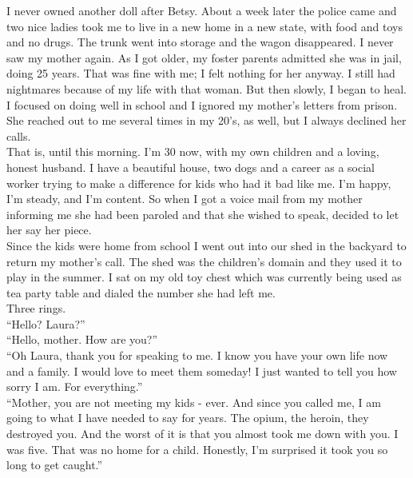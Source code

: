 \documentclass[a5paper]{scrartcl}
\begin{document}
I never owned another doll after Betsy. About a week later the police came and two nice ladies took me to live in a new home in a new state, with food and toys and no drugs. The trunk went into storage and the wagon disappeared. I never saw my mother again. As I got older, my foster parents admitted she was in jail, doing 25 years. That was fine with me; I felt nothing for her anyway. I still had nightmares because of my life with that woman. But then slowly, I began to heal. I focused on doing well in school and I ignored my mother's letters from prison. She reached out to me several times in my 20's, as well, but I always declined her calls.\\

That is, until this morning. I'm 30 now, with my own children and a loving, honest husband. I have a beautiful house, two dogs and a career as a social worker trying to make a difference for kids who had it bad like me. I'm happy, I'm steady, and I'm content. So when I got a voice mail from my mother informing me she had been paroled and that she wished to speak, decided to let her say her piece.\\

Since the kids were home from school I went out into our shed in the backyard to return my mother's call. The shed was the children's domain and they used it to play in the summer. I sat on my old toy chest which was currently being used as tea party table and dialed the number she had left me.\\

Three rings.\\

\enquote{Hello? Laura?}\\

\enquote{Hello, mother. How are you?}\\

\enquote{Oh Laura, thank you for speaking to me. I know you have your own life now and a family. I would love to meet them someday! I just wanted to tell you how sorry I am. For everything.}\\

\enquote{Mother, you are not meeting my kids - ever. And since you called me, I am going to what I have needed to say for years. The opium, the heroin, they destroyed you. And the worst of it is that you almost took me down with you. I was five. That was no home for a child. Honestly, I'm surprised it took you so long to get caught.}\\
\end{document}
